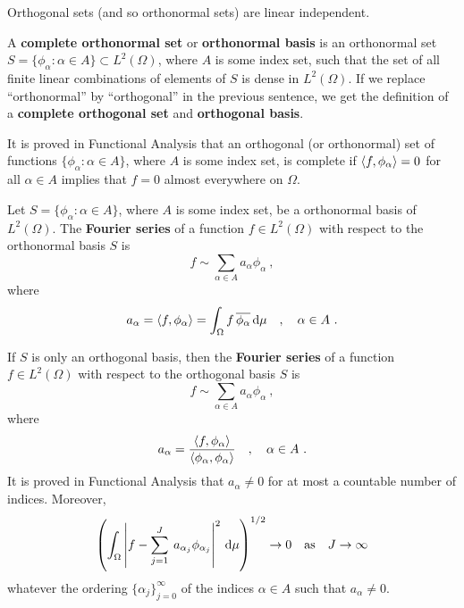 Orthogonal sets (and so orthonormal sets) are linear independent.

\begin{defn}
A {\bfseries complete orthonormal set} or
{\bfseries orthonormal basis} is an 
orthonormal set
$\displaystyle S= \{ \phi_\alpha : \alpha \in A \} \subset L^2(\Omega)$,
where $A$ is some index set, such that the set of all finite linear
combinations of elements of $S$ is dense in $L^2(\Omega)$.
If we replace ``orthonormal'' by ``orthogonal'' in the previous sentence,
we get the definition of a
{\bfseries complete orthogonal set}
and
{\bfseries orthogonal basis}.
\end{defn}

It is proved in Functional Analysis that an orthogonal (or orthonormal) set
of functions $\displaystyle \{ \phi_\alpha : \alpha \in A\}$, where $A$
is some index set, is complete if $\left\langle{f} , {\phi_\alpha}\right\rangle = 0$
for all $\alpha \in A$ implies that $f = 0$ almost everywhere on
$\Omega$.

\begin{defn}
Let $\displaystyle S= \{ \phi_\alpha : \alpha \in A \}$, where $A$ is some
index set, be a orthonormal basis of $L^2(\Omega)$.  The
{\bfseries Fourier series} of a function
$f \in L^2(\Omega)$ with respect to the orthonormal basis $S$ is
\[
f \sim \sum_{\alpha \in A} a_\alpha \phi_\alpha \ ,
\]
where
\[
a_\alpha = \left\langle{f} , {\phi_\alpha}\right\rangle
= \int_\Omega f\, \overline{\phi_\alpha} \,\mathrm{d}\mu \quad, \quad \alpha \in A \ .
\]
\end{defn}

If $S$ is only an orthogonal basis, then the
{\bfseries Fourier series} of a
function $f \in L^2(\Omega)$ with respect to the orthogonal basis $S$ is
\[
f \sim \sum_{\alpha \in A} a_\alpha \phi_\alpha \ ,
\]
where
\[
a_\alpha = \frac{\left\langle{f} , {\phi_\alpha}\right\rangle}{\left\langle{\phi_\alpha} , {\phi_\alpha}\right\rangle}
\quad, \quad \alpha \in A \  .
\]
It is proved in Functional Analysis that $a_\alpha \neq 0$ for at most a
countable number of indices.  Moreover,
\[
\left( \int_\Omega
\left|f - \sum_{j=1}^{J} \: a_{\alpha_j} \phi_{\alpha_j} \right|^2
\,\mathrm{d}\mu \right)^{1/2}
\rightarrow 0 \quad \text{as} \quad
J \rightarrow \infty
\]
whatever the ordering $\displaystyle \{ \alpha_j\}_{j=0}^\infty$ of the
indices $\alpha \in A$ such that $a_\alpha \neq 0$.

